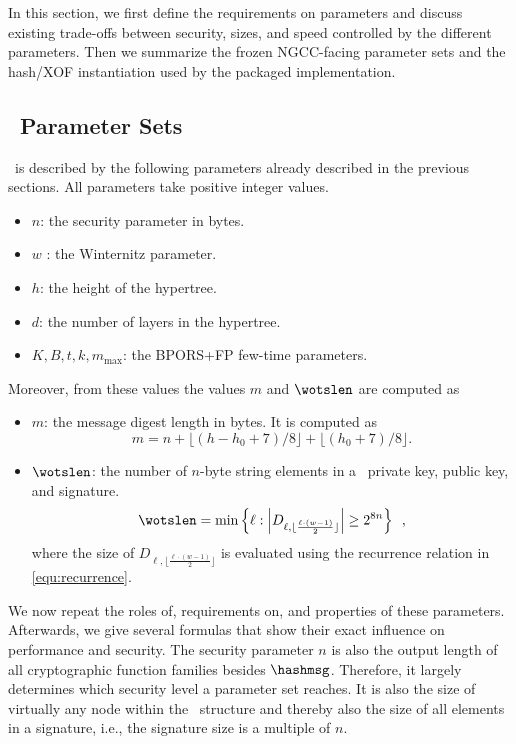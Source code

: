 In this section, we first define the requirements on parameters and discuss existing trade-offs between security, sizes, and speed controlled by the different parameters. Then we summarize the frozen NGCC-facing parameter sets and the hash/XOF instantiation used by the packaged implementation.


\subsection{\SPHINCSA\ Parameter Sets}

\SPHINCSA\ is described by the following parameters already described in the previous sections. All parameters take positive integer values.

\begin{itemize}

\item $n$: the security parameter in bytes.

\item $w$ : the Winternitz parameter.

\item $h$: the height of the hypertree.

\item $d$: the number of layers in the hypertree.

\item $K,B,t,k,m_{\max}$: the BPORS+FP few-time parameters.

\end{itemize}


Moreover, from these values the values $m$ and $\wotslen$ are computed as
\begin{itemize}
    \item $ m $: the message digest length in bytes. It is computed as
    $$m=n+\lfloor(h-h_0+7)/8\rfloor+\lfloor(h_0+7)/8\rfloor.$$
    \item $\wotslen$: the number of $n$-byte string elements in a \WOTSCS\ private key, public key, and signature.
    $$
    \wotslen = \min \left\{ \ell : \left| D_{\ell, \lfloor \frac{\ell \cdot (w-1)}{2} \rfloor} \right| \geq 2^{8n} \right\} \enspace,
    $$
    where the size of $D_{\ell, \lfloor \frac{\ell \cdot (w-1)}{2} \rfloor}$ is evaluated using the recurrence relation in \cref{equ:recurrence}.
\end{itemize}

We now repeat the roles of, requirements on, and properties of these parameters. Afterwards, we give several formulas that show their exact influence on performance and security. The security parameter $n$ is also the output length of all cryptographic function families besides $\hashmsg$. Therefore, it largely determines which security level a parameter set reaches. It is also the size of virtually any node within the \SPHINCSA\ structure and thereby also the size of all elements in a signature, i.e., the signature size is a multiple of $n$.

